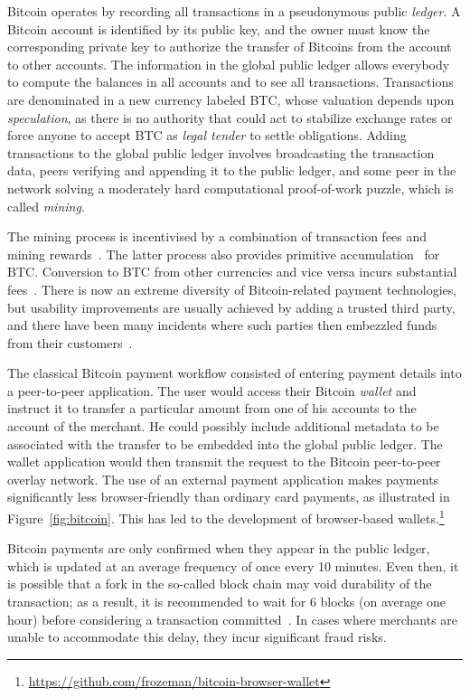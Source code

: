 \documentclass{llncs}
\begin{document}
Bitcoin operates by recording all transactions in a pseu\-do\-ny\-mous
public {\em ledger}.  A Bitcoin account is identified by its public
key, and the owner must know the corresponding private key to
authorize the transfer of Bitcoins from the account to other accounts.
The information in the global public ledger allows everybody to
compute the balances in all accounts and to see all transactions.
Transactions are denominated in a new currency labeled BTC, whose
valuation depends upon {\em speculation}, as there is no authority
that could act to stabilize exchange rates or force anyone to
accept BTC as {\em legal tender} to settle obligations.  Adding transactions to
the global public ledger involves broadcasting the transaction data,
peers verifying and appending it to the public ledger, and some peer
in the network solving a moderately hard computational proof-of-work
puzzle, which is called {\em mining}.

The mining process is incentivised by a combination of transaction
fees and mining rewards~\cite{nakamoto2008bitcoin}. The latter
process also provides primitive accumulation~\cite{primitiveacc} for BTC.
Conversion to BTC from other currencies and vice versa incurs
substantial fees~\cite{BTCfees}.  There is now an extreme diversity of
Bitcoin-related payment technologies, but usability improvements are
usually achieved by adding a trusted third party, and there have been
many incidents where such parties then embezzled funds from their
customers~\cite{BTC:demise}.

The classical Bitcoin payment workflow consisted of entering payment
details into a peer-to-peer application.  The user would access their
Bitcoin {\em wallet} and instruct it to transfer a particular amount
from one of his accounts to the account of the merchant. He could
possibly include additional metadata to be associated with the
transfer to be embedded into the global public ledger.  The wallet
application would then transmit the request to the Bitcoin
peer-to-peer overlay network.  The use of an external payment
application makes payments significantly less
browser-friendly than ordinary card payments, as illustrated in
Figure~\ref{fig:bitcoin}. This has led to the development of
browser-based
wallets.\footnote{\url{https://github.com/frozeman/bitcoin-browser-wallet}}

Bitcoin payments are only confirmed when they appear in the public
ledger, which is updated at an average frequency of once every 10
minutes.  Even then, it is possible that a fork in the so-called block
chain may void durability of the transaction; as a result, it is
recommended to wait for 6 blocks (on average one hour) before
considering a transaction committed~\cite{nakamoto2008bitcoin}.  In
cases where merchants are unable to accommodate this delay, they incur
significant fraud risks.
\end{document}

